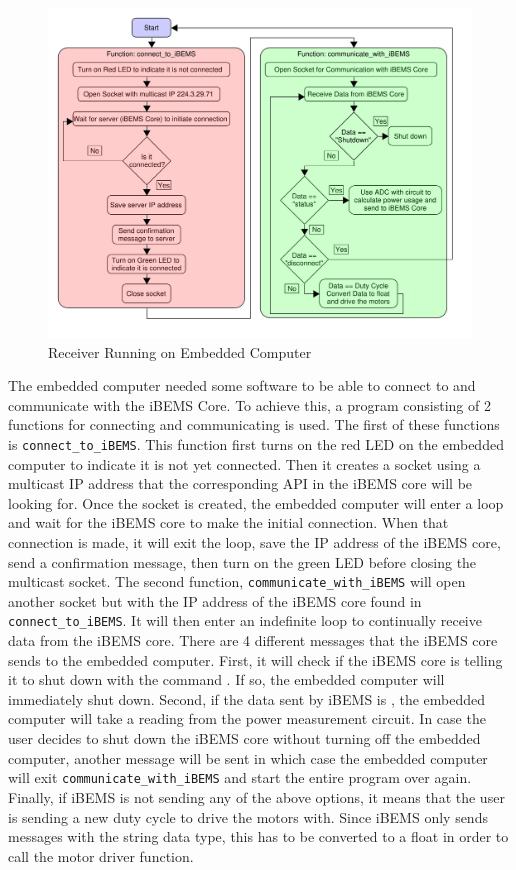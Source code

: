 \documentclass[conference]{IEEEtran}
\begin{document}
\begin{figure}[htbp]
    \centering
    \includegraphics[scale=0.25]{figs/beaglebone/Beaglebone_Receiver_Diagram.pdf}
    \caption{Receiver Running on Embedded Computer}
    \label{fig:Beaglebone_Receiver_Diagram}
\end{figure}

The embedded computer needed some software to be able to connect to and communicate with the iBEMS Core. To achieve this, a program consisting of 2 functions for connecting and communicating is used.
\medbreak
The first of these functions is \texttt{connect\_to\_iBEMS}. This function first turns on the red LED on the embedded computer to indicate it is not yet connected. Then it creates a socket using a multicast IP address that the corresponding API in the iBEMS core will be looking for. Once the socket is created, the embedded computer will enter a loop and wait for the iBEMS core to make the initial connection. When that connection is made, it will exit the loop, save the IP address of the iBEMS core, send a confirmation message, then turn on the green LED before closing the multicast socket.
\medbreak
The second function, \texttt{communicate\_with\_iBEMS} will open another socket but with the IP address of the iBEMS core found in \texttt{connect\_to\_iBEMS}. It will then enter an indefinite loop to continually receive data from the iBEMS core. There are 4 different messages that the iBEMS core sends to the embedded computer. First, it will check if the iBEMS core is telling it to shut down with the command . If so, the embedded computer will immediately shut down. Second, if the data sent by iBEMS is , the embedded computer will take a reading from the power measurement circuit. In case the user decides to shut down the iBEMS core without turning off the embedded computer, another message  will be sent in which case the embedded computer will exit \texttt{communicate\_with\_iBEMS} and start the entire program over again. Finally, if iBEMS is not sending any of the above options, it means that the user is sending a new duty cycle to drive the motors with. Since iBEMS only sends messages with the string data type, this has to be converted to a float in order to call the motor driver function. 
\end{document}
